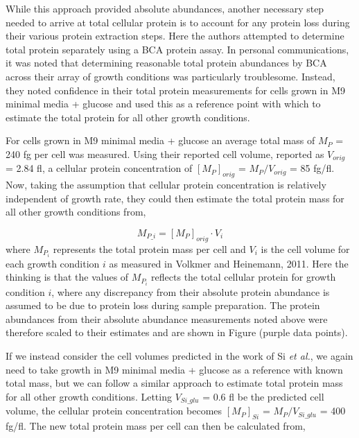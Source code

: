 While this approach provided absolute abundances, another necessary step needed
to arrive at total cellular protein is to account for any protein loss during
their various protein extraction steps. Here the authors attempted to determine
total protein separately using a BCA protein assay.  In personal communications,
it was noted that determining reasonable total protein abundances by BCA across
their array of growth conditions  was particularly troublesome. Instead, they
noted confidence in their total protein measurements for cells grown in M9
minimal media + glucose and  used this as a reference point with which to
estimate the total protein for all other growth conditions.

For cells grown in M9 minimal media + glucose an average total mass of $M_P$ =
240 fg per cell was measured. Using their reported cell volume, reported as
$V_{orig}$ = 2.84 fl, a cellular protein concentration of $[M_P]_{orig}$ =
$M_P/V_{orig}$ = 85 fg/fl. Now, taking the assumption that cellular protein
concentration is relatively independent of growth rate, they could then estimate
the total protein mass for all other growth conditions from,

\begin{equation}
	M_{P\_i} = [M_P]_{orig} \cdot V_{i}
\end{equation}
where $M_{P_i}$ represents the total protein mass per cell and $V_{i}$ is the
cell volume for each growth condition $i$ as measured in Volkmer and Heinemann,
2011. Here the thinking is that the values of $M_{P_i}$ reflects the total
cellular protein for growth condition $i$, where any discrepancy from their
absolute protein abundance is assumed to be due to protein loss during sample
preparation. The protein abundances from their absolute abundance measurements
noted above were therefore scaled to their estimates and are  shown in Figure
 (purple data points).



If we instead consider the cell volumes predicted in the work of Si \textit{et
al.}, we again need to take growth in M9 minimal media + glucose as a reference
with known total mass, but we can follow a similar approach to estimate total
protein mass for all other growth conditions. Letting  $V_{Si\_glu}$ = 0.6 fl be
the predicted cell volume, the cellular protein concentration becomes
$[M_P]_{Si}$ = $M_P/V_{Si\_glu}$ = 400 fg/fl. The new total protein mass per
cell can then be calculated from,

